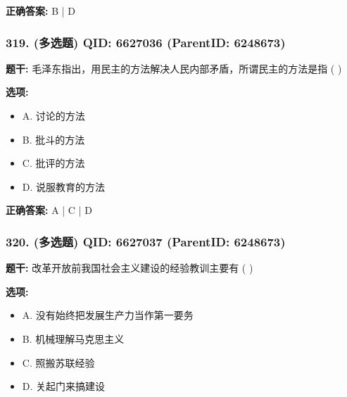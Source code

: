 \documentclass[12pt,UTF8]{ctexart}
\begin{document}
\textbf{正确答案:}
B | D

\vspace{0.3em}\hrulefill\vspace{0.7em}

\subsubsection*{319. (多选题) \small QID: 6627036 (ParentID: 6248673)}

\textbf{题干:}
毛泽东指出，用民主的方法解决人民内部矛盾，所谓民主的方法是指  ( )



\textbf{选项:}
\begin{itemize}[leftmargin=*]

  \item A. 讨论的方法

  \item B. 批斗的方法

  \item C. 批评的方法

  \item D. 说服教育的方法

\end{itemize}

\textbf{正确答案:}
A | C | D

\vspace{0.3em}\hrulefill\vspace{0.7em}

\subsubsection*{320. (多选题) \small QID: 6627037 (ParentID: 6248673)}

\textbf{题干:}
改革开放前我国社会主义建设的经验教训主要有  ( )



\textbf{选项:}
\begin{itemize}[leftmargin=*]

  \item A. 没有始终把发展生产力当作第一要务

  \item B. 机械理解马克思主义

  \item C. 照搬苏联经验

  \item D. 关起门来搞建设

\end{itemize}
\end{document}
